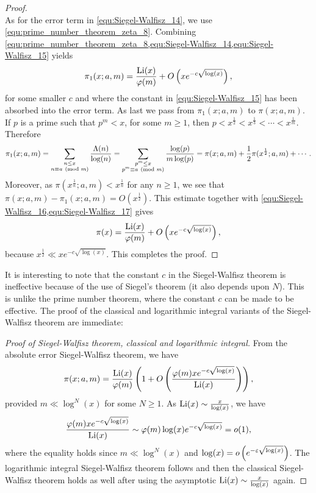 \begin{proof}
\begin{equation}
      \end{equation}
      As for the error term in \cref{equ:Siegel-Walfisz_14}, we use \cref{equ:prime_number_theorem_zeta_8}. Combining \cref{equ:prime_number_theorem_zeta_8,equ:Siegel-Walfisz_14,equ:Siegel-Walfisz_15} yields
      \begin{equation}\label{equ:Siegel-Walfisz_16}
        \pi_{1}(x;a,m) = \frac{\operatorname{\mathrm{Li}}(x)}{\varphi(m)}+O\left(xe^{-c\sqrt{\log(x)}}\right),
      \end{equation}
      for some smaller $c$ and where the constant in \cref{equ:Siegel-Walfisz_15} has been absorbed into the error term. As last we pass from $\pi_{1}(x;a,m)$ to $\pi(x;a,m)$. If $p$ is a prime such that $p^{m} < x$, for some $m \ge 1$, then $p < x^{\frac{1}{2}} < x^{\frac{1}{3}} < \cdots < x^{\frac{1}{m}}$. Therefore
      \begin{equation}\label{equ:Siegel-Walfisz_17}
        \pi_{1}(x;a,m) = \sum_{\substack{n \le x \\ n \equiv a \ (\mathrm{mod}\text{ }m)}}\frac{\Lambda(n)}{\log(n)} = \sum_{\substack{p^{m} \le x \\ p^{m} \equiv a \ (\mathrm{mod}\text{ }m)}}\frac{\log(p)}{m\log(p)} = \pi(x;a,m)+\frac{1}{2}\pi(x^{\frac{1}{2}};a,m)+\cdots.
      \end{equation}
      Moreover, as $\pi(x^{\frac{1}{n}};a,m) < x^{\frac{1}{n}}$ for any $n \ge 1$, we see that $\pi(x;a,m)-\pi_{1}(x;a,m) = O(x^{\frac{1}{2}})$. This estimate together with \cref{equ:Siegel-Walfisz_16,equ:Siegel-Walfisz_17} gives
      \[
        \pi(x) = \frac{\operatorname{\mathrm{Li}}(x)}{\varphi(m)}+O\left(xe^{-c\sqrt{\log(x)}}\right),
      \]
      because $x^{\frac{1}{2}} \ll xe^{-c\sqrt{\log(x)}}$. This completes the proof.
    \end{proof}

    It is interesting to note that the constant $c$ in the Siegel-Walfisz theorem is ineffective because of the use of Siegel's theorem (it also depends upon $N$). This is unlike the prime number theorem, where the constant $c$ can be made to be effective. The proof of the classical and logarithmic integral variants of the Siegel-Walfisz theorem are immediate:

    \begin{proof}[Proof of Siegel-Walfisz theorem, classical and logarithmic integral]
      From the absolute error Siegel-Walfisz theorem, we have
      \[
        \pi(x;a,m) = \frac{\operatorname{\mathrm{Li}}(x)}{\varphi(m)}\left(1+O\left(\frac{\varphi(m)xe^{-c\sqrt{\log(x)}}}{\operatorname{\mathrm{Li}}(x)}\right)\right),
      \]
      provided $m \ll \log^{N}(x)$ for some $N \ge 1$. As $\operatorname{\mathrm{Li}}(x) \sim \frac{x}{\log(x)}$, we have
      \[
        \frac{\varphi(m)xe^{-c\sqrt{\log(x)}}}{\operatorname{\mathrm{Li}}(x)} \sim \varphi(m)\log(x)e^{-c\sqrt{\log(x)}} = o(1),
      \]
      where the equality holds since $m \ll \log^{N}(x)$ and $\log(x) = o\left(e^{-\varepsilon\sqrt{\log(x)}}\right)$. The logarithmic integral Siegel-Walfisz theorem follows and then the classical Siegel-Walfisz theorem holds as well after using the asymptotic $\operatorname{\mathrm{Li}}(x) \sim \frac{x}{\log(x)}$ again.
    \end{proof}
    
